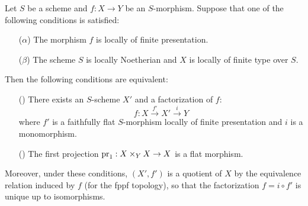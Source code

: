 \begin{theorem}\label{scheme morphism local fp factorization by quotient iff}
Let $S$ be a scheme and $f:X\to Y$ be an $S$-morphism. Suppose that one of the following conditions is satisfied:
\begin{enumerate}
    \item[($\alpha$)] The morphism $f$ is locally of finite presentation.
    \item[($\beta$)] The scheme $S$ is locally Noetherian and $X$ is locally of finite type over $S$. 
\end{enumerate} Then the following conditions are equivalent:
\begin{enumerate}
    \item[(\rmnum{1})] There exists an $S$-scheme $X'$ and a factorization of $f$:
    \[f:X\stackrel{f'}{\to} X'\stackrel{i}{\to}Y\]
    where $f'$ is a faithfully flat $S$-morphism locally of finite presentation and $i$ is a monomorphism.
    \item[(\rmnum{2})] The first projection $\mathrm{pr}_1:X\times_YX\to X$ is a flat morphism.
\end{enumerate}
Moreover, under these conditions, $(X',f')$ is a quotient of $X$ by the equivalence relation induced by $f$ (for the fppf topology), so that the factorization $f=i\circ f'$ is unique up to isomorphisms.
\end{theorem}
